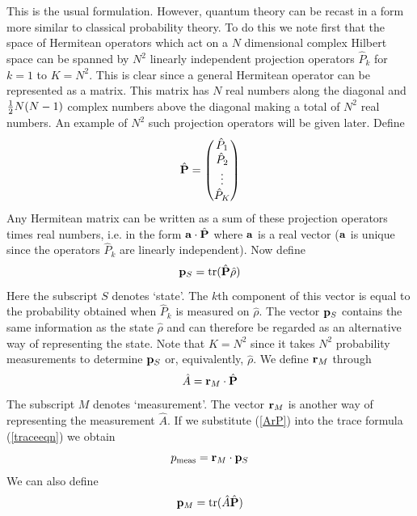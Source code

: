 \documentclass[10pt,twocolumn]{article}
\begin{document}
This is the usual formulation.  However, quantum theory can be recast in
a form more similar to classical probability theory. To do this we note
first that the space of Hermitean operators which act on a $N$
dimensional complex Hilbert space can be spanned by $N^2$ linearly
independent projection
operators $\hat{P}_k$ for $k=1$ to $K=N^2$.  This is clear since a general
Hermitean operator can be represented as a matrix. This matrix has $N$
real numbers along the diagonal and ${1\over2}N(N-1)$ complex numbers
above the diagonal making a total of $N^2$ real numbers.  An example of
$N^2$ such projection operators will be given later.  Define
\begin{equation}
\hat{\bf P}=\left(
\begin{matrix} \hat{P}_1 \\ \hat{P}_2 \\ \vdots \\ \hat{P}_K
\end{matrix} \right)
\end{equation}
Any Hermitean matrix can be written as a sum of these projection
operators times real numbers, i.e. in the form ${\bf a}\cdot\hat{\bf P}$
where $\bf a$ is a real vector ($\bf a$ is unique since the operators
$\hat{P}_k$ are linearly independent).
Now define
\begin{equation}
{\bf p}_S = {\rm tr}(\hat{\bf P} \hat{\rho})
\end{equation}
Here the subscript $S$ denotes \lq state\rq.  The $k$th component of
this vector is equal to the probability obtained when $\hat{P}_k$ is
measured on $\hat{\rho}$.
The vector ${\bf p}_S$ contains the same information as the state
$\hat{\rho}$
and can therefore be regarded as an alternative way of representing the
state.  Note that $K=N^2$ since it takes $N^2$ probability measurements
to determine
${\bf p}_S$ or, equivalently, $\hat{\rho}$. We define ${\bf r}_M$
through 
\begin{equation}\label{ArP}
\hat{A} = {\bf r}_M\cdot\hat{\bf P}
\end{equation}
The subscript $M$ denotes \lq measurement\rq. The vector ${\bf r}_M$ is
another way of representing the measurement $\hat{A}$.  If we
substitute (\ref{ArP}) into the trace formula (\ref{traceeqn}) we obtain
\begin{equation}\label{Qrp}
p_{\rm meas}= {\bf r}_M\cdot {\bf p}_S
\end{equation}
We can also define
\begin{equation}
{\bf p}_M = {\rm tr}(\hat{A}\hat{\bf P})
\end{equation}
\end{document}
